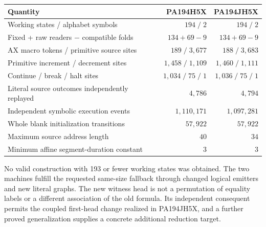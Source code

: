 \documentclass[11pt]{article}
\begin{document}
\begin{center}
\begin{tabular}{@{}lrr@{}}
\toprule
Quantity & PA194H5X & PA194JH5X\\
\midrule
Working states / alphabet symbols & $194\;/\;2$ & $194\;/\;2$\\
Fixed + raw readers $-$ compatible folds & $134+69-9$ & $134+69-9$\\
AX macro tokens / primitive source sites & $189\;/\;3,677$ & $188\;/\;3,683$\\
Primitive increment / decrement sites & $1,458\;/\;1,109$ & $1,460\;/\;1,111$\\
Continue / break / halt sites & $1,034\;/\;75\;/\;1$ & $1,036\;/\;75\;/\;1$\\
Literal source outcomes independently replayed & $4,786$ & $4,794$\\
Independent symbolic execution events & $1,110,171$ & $1,097,281$\\
Whole blank initialization transitions & $57,922$ & $57,922$\\
Maximum source address length & $40$ & $34$\\
Minimum affine segment-duration constant & $3$ & $3$\\
\bottomrule
\end{tabular}
\end{center}

No valid construction with 193 or fewer working states was obtained.
The two machines fulfill the requested same-size fallback through changed
logical emitters and new literal graphs.  The new witness head is not a
permutation of equality labels or a different association of the old
formula.  Its independent consequent permits the coupled first-head
change realized in PA194JH5X, and a further proved generalization supplies
a concrete additional reduction target.






\end{document}
